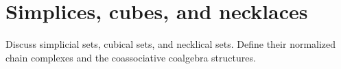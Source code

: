 \section{Simplices, cubes, and necklaces}

Discuss simplicial sets, cubical sets, and necklical sets. Define their normalized chain complexes and the coassociative coalgebra structures.

%
%
%
%
%
%
%
